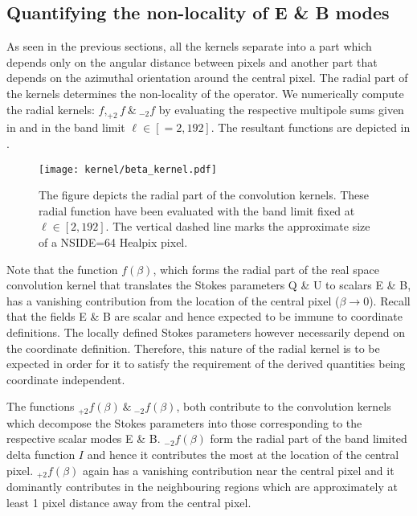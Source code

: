 \subsection{Quantifying the non-locality of E \& B modes} \label{sec:radial_locality}

As seen in the previous sections, all the kernels separate into a part which depends only on the angular distance between pixels and another part that depends on the azimuthal orientation around the central pixel. The radial part of the kernels determines the non-locality of the operator. 
We numerically compute the radial kernels: $f, _{+2}f ~\&~ _{-2}f $ by evaluating the respective multipole sums given in  and  in the band limit $\ell \in [=2,192]$. The resultant functions are depicted in . 
%
\begin{figure}[!hbt]
\centering
\texttt{[image: kernel/beta\_kernel.pdf]}
\caption{The figure depicts the radial part of the convolution kernels. These radial function have been evaluated with the band limit fixed at $\ell \in [2,192]$. The vertical dashed line marks the approximate size of a NSIDE=64 Healpix pixel.}
\label{fig:beta_kernel}
\end{figure}
%
Note that the function $f(\beta)$, which forms the radial part of the real space convolution kernel that translates the Stokes parameters Q \& U to scalars E \& B, has a vanishing contribution from the location of the central pixel ($\beta \rightarrow 0$). Recall that the fields E \& B are scalar and hence expected to be immune to coordinate definitions. The locally defined Stokes parameters however necessarily depend on the coordinate definition. Therefore, this nature of the radial kernel is to be expected in order for it to satisfy the requirement of the derived quantities being coordinate independent. 

The functions $_{+2}f(\beta)~\&~_{-2}f(\beta)$, both contribute to the convolution kernels which decompose the Stokes parameters into those corresponding to the respective scalar modes E \& B. $_{-2}f(\beta)$ form the radial part of the band limited delta function $I$ and hence it contributes the most at the location of the central pixel. $_{+2}f(\beta)$ again has a vanishing contribution near the central pixel and it dominantly contributes in the neighbouring regions which are approximately at least 1 pixel distance away from the central pixel.


